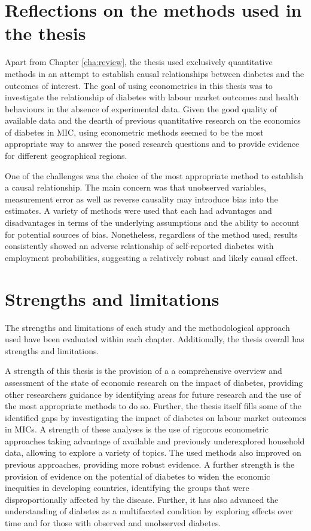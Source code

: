 \section{Reflections on the methods used in the thesis}

Apart from Chapter \ref{cha:review}, the thesis used exclusively quantitative methods in an attempt to establish causal relationships between diabetes and the outcomes of interest. The goal of using econometrics in this thesis was to investigate the relationship of diabetes with labour market outcomes and health behaviours in the absence of experimental data. Given the good quality of available data and the dearth of previous quantitative research on the economics of diabetes in \ac{MIC}, using econometric methods seemed to be the most appropriate way to answer the posed research questions and to provide evidence for different geographical regions.

One of the challenges was the choice of the most appropriate method to establish a causal relationship. The main concern was that unobserved variables, measurement error as well as reverse causality may introduce bias into the estimates. A variety of methods were used that each had advantages and disadvantages in terms of the underlying assumptions and the ability to account for potential sources of bias. Nonetheless, regardless of the method used, results consistently showed an adverse relationship of self-reported diabetes with employment probabilities, suggesting a relatively robust and likely causal effect.

\section{Strengths and limitations}

The strengths and limitations of each study and the methodological approach used have been evaluated within each chapter. Additionally, the thesis overall has strengths and limitations.

A strength of this thesis is the provision of a a comprehensive overview and assessment of the state of economic research on the impact of diabetes, providing other researchers guidance by identifying areas for future research and the use of the most appropriate methods to do so. Further, the thesis itself fills some of the identified gaps by investigating the impact of diabetes on labour market outcomes in \acp{MIC}. A strength of these analyses is the use of rigorous econometric approaches taking advantage of available and previously underexplored household data, allowing to explore a variety of topics. The used methods also improved on previous approaches, providing more robust evidence.  A further strength is the provision of evidence on the potential of diabetes to widen the economic inequities in developing countries, identifying the groups that were disproportionally affected by the disease. Further, it has also advanced the understanding of diabetes as a multifaceted condition by exploring effects over time and for those with observed and unobserved diabetes. 

